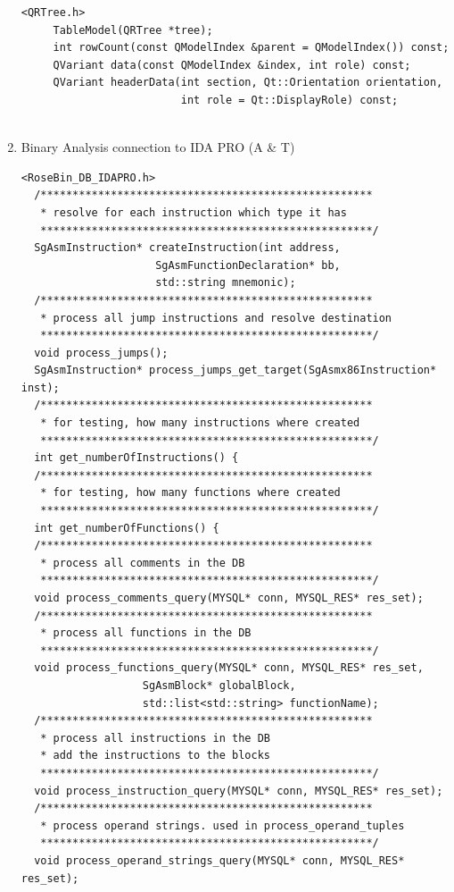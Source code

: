 \begin{enumerate}
\begin{lstlisting}
<QRTree.h>
     TableModel(QRTree *tree);
     int rowCount(const QModelIndex &parent = QModelIndex()) const;
     QVariant data(const QModelIndex &index, int role) const;
     QVariant headerData(int section, Qt::Orientation orientation,
                         int role = Qt::DisplayRole) const;


         \end{lstlisting}

   \item Binary Analysis connection to IDA PRO (A \& T)

\begin{lstlisting}
<RoseBin_DB_IDAPRO.h>
  /****************************************************
   * resolve for each instruction which type it has
   ****************************************************/
  SgAsmInstruction* createInstruction(int address, 
					 SgAsmFunctionDeclaration* bb, 
					 std::string mnemonic);
  /****************************************************
   * process all jump instructions and resolve destination
   ****************************************************/
  void process_jumps();
  SgAsmInstruction* process_jumps_get_target(SgAsmx86Instruction* inst);
  /****************************************************
   * for testing, how many instructions where created
   ****************************************************/
  int get_numberOfInstructions() {
  /****************************************************
   * for testing, how many functions where created
   ****************************************************/
  int get_numberOfFunctions() {
  /****************************************************
   * process all comments in the DB
   ****************************************************/
  void process_comments_query(MYSQL* conn, MYSQL_RES* res_set);
  /****************************************************
   * process all functions in the DB
   ****************************************************/
  void process_functions_query(MYSQL* conn, MYSQL_RES* res_set,
			       SgAsmBlock* globalBlock,
			       std::list<std::string> functionName);
  /****************************************************
   * process all instructions in the DB
   * add the instructions to the blocks
   ****************************************************/
  void process_instruction_query(MYSQL* conn, MYSQL_RES* res_set);
  /****************************************************
   * process operand strings. used in process_operand_tuples
   ****************************************************/
  void process_operand_strings_query(MYSQL* conn, MYSQL_RES* res_set);

\end{lstlisting}
\end{enumerate}
